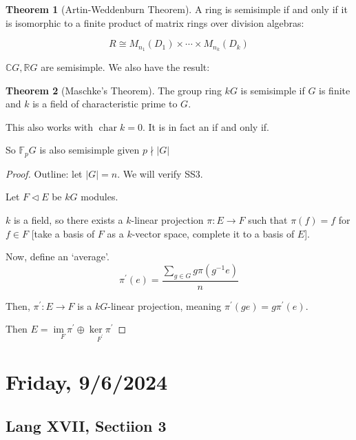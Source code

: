 \documentclass{article}
\theoremstyle{definition}
\newtheorem{theorem}{Theorem}
\newcommand{\im}{\operatorname{im}}
\begin{document}
\begin{theorem}
    [Artin-Weddenburn Theorem]

    A ring is semisimple if and only if it is isomorphic to a finite product of matrix rings over division algebras:

    \[
        R \cong M_{n_1}(D_1) \times \cdots \times M_{n_k}(D_k)
    \]

\end{theorem}

\(\mathbb{C} G, \mathbb{R} G\) are semisimple. We also have the result:

\begin{theorem}
    [Maschke's Theorem] The group ring \(kG\) is semisimple if \(G\) is finite and \(k\) is a field of characteristic prime to \(G\).

    This also works with \(\operatorname{char} k = 0\). It is in fact an if and only if.
\end{theorem}

So \(\mathbb{F}_p G\) is also semisimple given \(p \nmid \vert G \vert\)

\begin{proof}
    Outline: let \(\vert G \vert = n\). We will verify SS3.

    Let \(F \triangleleft E\) be \(kG\) modules.
    
    \(k\) is a field, so there exists a \(k\)-linear projection \(\pi : E \to F\) such that \(\pi(f) = f\) for \(f\in F\) [take a basis of \(F\) as a \(k\)-vector space, complete it to a basis of \(E\)].

    Now, define an `average'.
    \[
        \pi ^{\prime}(e) = \frac{\sum_{g\in G} g \pi (g ^{-1} e)}{n}
    \]

    Then, \(\pi ^{\prime} : E \to F\) is a \(kG\)-linear projection, meaning \(\pi ^{\prime} (ge) = g \pi ^{\prime} (e)\).

    Then \(E = \underset{F}{\im \pi ^{\prime}} \oplus \underset{F^{\prime}}{\ker \pi ^{\prime} }  \) 

\end{proof}


\section*{Friday, 9/6/2024}

\subsection*{Lang XVII, Sectiion 3}
\end{document}
